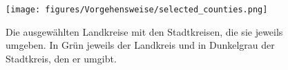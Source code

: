 \begin{figure}[H]
    \centering
    \texttt{[image: figures/Vorgehensweise/selected\_counties.png]}
    \caption{Die ausgewählten Landkreise mit den Stadtkreisen, die sie jeweils umgeben. In Grün jeweils der Landkreis und in Dunkelgrau der Stadtkreis, den er umgibt.}
    \label{fig:selected_counties}
\end{figure}